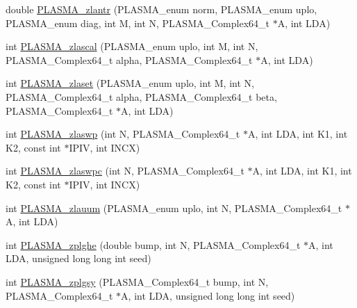 \begin{DoxyCompactItemize}
\item 
double \hyperlink{group__PLASMA__Complex64__t_ga34d019535c07ecb781380648bb92ce1c_ga34d019535c07ecb781380648bb92ce1c}{P\+L\+A\+S\+M\+A\+\_\+zlantr} (P\+L\+A\+S\+M\+A\+\_\+enum norm, P\+L\+A\+S\+M\+A\+\_\+enum uplo, P\+L\+A\+S\+M\+A\+\_\+enum diag, int M, int N, P\+L\+A\+S\+M\+A\+\_\+\+Complex64\+\_\+t $\ast$A, int L\+D\+A)
\item 
int \hyperlink{group__PLASMA__Complex64__t_ga17968ad2d92d8ea27e1e4ccea3c7d569_ga17968ad2d92d8ea27e1e4ccea3c7d569}{P\+L\+A\+S\+M\+A\+\_\+zlascal} (P\+L\+A\+S\+M\+A\+\_\+enum uplo, int M, int N, P\+L\+A\+S\+M\+A\+\_\+\+Complex64\+\_\+t alpha, P\+L\+A\+S\+M\+A\+\_\+\+Complex64\+\_\+t $\ast$A, int L\+D\+A)
\item 
int \hyperlink{group__PLASMA__Complex64__t_gad41de0032d2290e448cfc67683dc01bb_gad41de0032d2290e448cfc67683dc01bb}{P\+L\+A\+S\+M\+A\+\_\+zlaset} (P\+L\+A\+S\+M\+A\+\_\+enum uplo, int M, int N, P\+L\+A\+S\+M\+A\+\_\+\+Complex64\+\_\+t alpha, P\+L\+A\+S\+M\+A\+\_\+\+Complex64\+\_\+t beta, P\+L\+A\+S\+M\+A\+\_\+\+Complex64\+\_\+t $\ast$A, int L\+D\+A)
\item 
int \hyperlink{group__PLASMA__Complex64__t_gacc6ccd85efa0bbc451731b0ba5a1d11a_gacc6ccd85efa0bbc451731b0ba5a1d11a}{P\+L\+A\+S\+M\+A\+\_\+zlaswp} (int N, P\+L\+A\+S\+M\+A\+\_\+\+Complex64\+\_\+t $\ast$A, int L\+D\+A, int K1, int K2, const int $\ast$I\+P\+I\+V, int I\+N\+C\+X)
\item 
int \hyperlink{group__PLASMA__Complex64__t_gaad7e6621e986a380618b84cd67359d7c_gaad7e6621e986a380618b84cd67359d7c}{P\+L\+A\+S\+M\+A\+\_\+zlaswpc} (int N, P\+L\+A\+S\+M\+A\+\_\+\+Complex64\+\_\+t $\ast$A, int L\+D\+A, int K1, int K2, const int $\ast$I\+P\+I\+V, int I\+N\+C\+X)
\item 
int \hyperlink{group__PLASMA__Complex64__t_ga0e1f064db19e3855c590172274fbdf43_ga0e1f064db19e3855c590172274fbdf43}{P\+L\+A\+S\+M\+A\+\_\+zlauum} (P\+L\+A\+S\+M\+A\+\_\+enum uplo, int N, P\+L\+A\+S\+M\+A\+\_\+\+Complex64\+\_\+t $\ast$A, int L\+D\+A)
\item 
int \hyperlink{group__PLASMA__Complex64__t_ga3a50559a69450b4f13a23c4af092c60e_ga3a50559a69450b4f13a23c4af092c60e}{P\+L\+A\+S\+M\+A\+\_\+zplghe} (double bump, int N, P\+L\+A\+S\+M\+A\+\_\+\+Complex64\+\_\+t $\ast$A, int L\+D\+A, unsigned long long int seed)
\item 
int \hyperlink{group__PLASMA__Complex64__t_ga065c2bc2190fc079035e1de4d16e4e60_ga065c2bc2190fc079035e1de4d16e4e60}{P\+L\+A\+S\+M\+A\+\_\+zplgsy} (P\+L\+A\+S\+M\+A\+\_\+\+Complex64\+\_\+t bump, int N, P\+L\+A\+S\+M\+A\+\_\+\+Complex64\+\_\+t $\ast$A, int L\+D\+A, unsigned long long int seed)

\end{DoxyCompactItemize}
